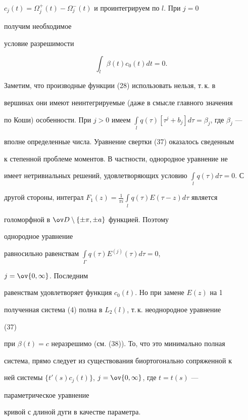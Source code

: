 $c_j(t)=\Omega^+_j(t)-\Omega^-_j(t)$ и проинтегрируем по $l$. При $j=0$ 


получим необходимое  


условие разрешимости 


\begin{equation} 


\int_l \beta(t)c_0(t)d t=0. 


\end{equation} 


Заметим, что производные функции (28) использовать нельзя, т.\,к. в  


вершинах они имеют неинтегрируемые (даже в смысле главного значения 


по Коши) особенности. При $j>0$ имеем $\int\limits_l q(\tau)[\tau^j+ 


b_j]d\tau=\beta_j$, где $\beta_j$ --- 


вполне определенные числа. Уравнение свертки (37) оказалось сведенным  


к степенной проблеме моментов. В частности, однородное уравнение не 


имеет нетривиальных решений, удовлетворяющих условию $\int\limits_l 


q(\tau)d\tau=0$. С 


другой стороны, интеграл $F_1(z)=\frac{1}{\pi i}\int\limits_l q(\tau) 


E(\tau-z)d\tau$ является 


голоморфной в $\ov D\setminus\{\pm\pi,\pm a\}$ функцией. Поэтому 


однородное уравнение 


равносильно равенствам $\int\limits_\Gamma q(\tau)E^{(j)}(\tau)d\tau=0$, 


$j=\ov{0,\infty}$. Последним  


равенствам удовлетворяет функция $c_0(t)$. Но при замене $E(z)$ на 1 


полученная система (4) полна в $L_2(l)$, т.\,к. неоднородное уравнение 


(37) 


при $\beta(t)=c$ неразрешимо (см. (38)). То, что это минимально полная 


система, прямо следует из существования биортогонально сопряженной к  


ней системы $\{t'(s)c_j(t)\}$, $j=\ov{0,\infty}$, где $t=t(s)$ --- 


параметрическое уравнение  


кривой с длиной дуги в качестве параметра.  


